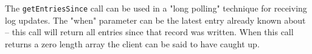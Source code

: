 The \verb+getEntriesSince+ call can be used in a "long polling" technique for receiving log updates. The
"when" parameter can be the latest entry already known about -- this call will return all entries since that
record was written. When this call returns a zero length array the client can be said to have caught up.
